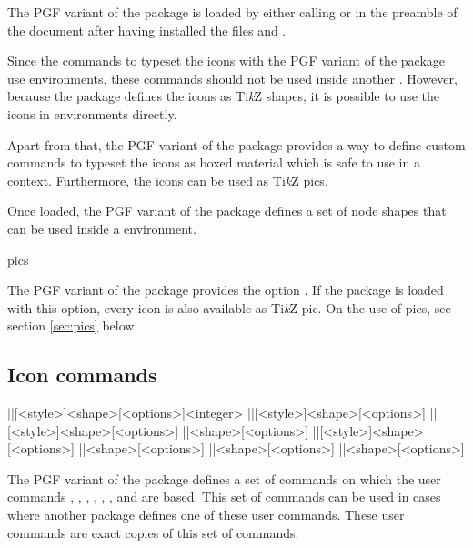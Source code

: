 \documentclass[a4paper]{article}
\begin{document}
The PGF variant of the package is loaded by either calling \macro{\usepackage[pgf]{rpgicons}} or \macro{\usepackage{rpgicons-pgf}} in the preamble of the document after having installed the files  and .

Since the commands to typeset the icons with the PGF variant of the package use  environments, these commands should not be used inside another . However, because the package defines the icons as Ti\emph{k}Z shapes, it is possible to use the icons in  environments directly.

Apart from that, the PGF variant of the package provides a way to define custom commands to typeset the icons as boxed material which is safe to use in a  context. Furthermore, the icons can be used as Ti\emph{k}Z pics.

Once loaded, the PGF variant of the package defines a set of node shapes that can be used inside a  environment.

\begin{macrodef}pics\end{macrodef}
The PGF variant of the package provides the option . If the package is loaded with this option, every icon is also available as Ti\emph{k}Z pic. On the use of pics, see section \ref{sec:pics} below.

\subsection{Icon commands}

\begin{macrodef}
|\rpgiconsdie|[<style>]{<shape>}[<options>]{<integer>}
|\rpgiconsability|[<style>]{<shape>}[<options>]
|\rpgiconssaving|[<style>]{<shape>}[<options>]
|\rpgiconsspell|{<shape>}[<options>]
|\rpgiconsspellschool|[<style>]{<shape>}[<options>]
|\rpgiconsdamage|{<shape>}[<options>]
|\rpgiconsattack|{<shape>}[<options>]
|\rpgiconscondition|{<shape>}[<options>]
\end{macrodef}
The PGF variant of the package defines a set of commands on which the user commands \macro{\die}, \macro{\ability}, \macro{\saving}, \macro{\spell}, \macro{\spellschool}, \macro{\damage}, \macro{\attack} and \macro{\condition} are based. This set of commands can be used in cases where another package defines one of these user commands. These user commands are exact copies of this set of commands.
\end{document}
